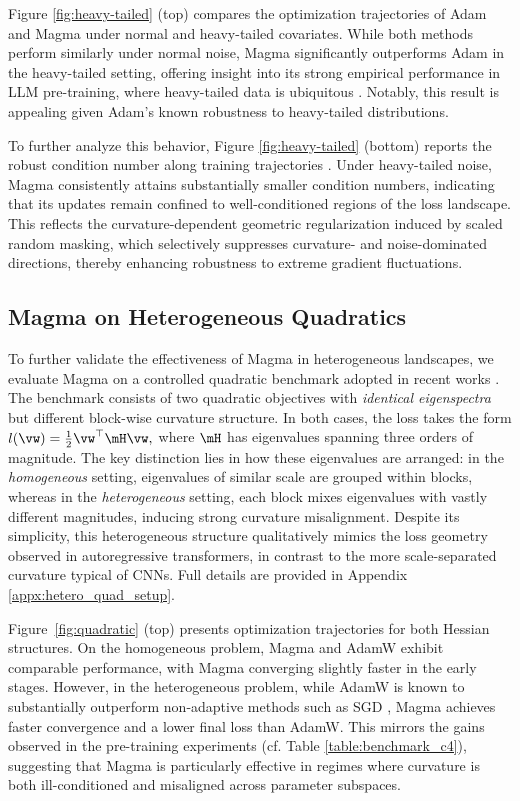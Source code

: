 \documentclass[11pt, a4paper, twocolumn, copyright, goog]{google}
\theoremstyle{plain}
\theoremstyle{definition}
\theoremstyle{remark}
\begin{document}
Figure \ref{fig:heavy-tailed} (top) compares the optimization trajectories of Adam and Magma under normal and heavy-tailed covariates. 
While both methods perform similarly under normal noise, Magma significantly outperforms Adam in the heavy-tailed setting, offering insight into its strong empirical performance in LLM pre-training, where heavy-tailed data is ubiquitous \citep{kunstner2024heavy,ahn2023linear}. 
Notably, this result is appealing given Adam’s known robustness to heavy-tailed distributions.


To further analyze this behavior, Figure \ref{fig:heavy-tailed} (bottom) reports the robust condition number along training trajectories \citep{jiang2023does}. Under heavy-tailed noise, Magma consistently attains substantially smaller condition numbers, indicating that its updates remain confined to well-conditioned regions of the loss landscape. This reflects the curvature-dependent geometric regularization induced by scaled random masking, which selectively suppresses curvature- and noise-dominated directions, thereby enhancing robustness to extreme gradient fluctuations.



\subsection{Magma on Heterogeneous Quadratics}
To further validate the effectiveness of Magma in heterogeneous landscapes, we evaluate Magma on a controlled quadratic benchmark adopted in recent works \citep{zhang2024transformers, orvieto2025search}.
The benchmark consists of two quadratic objectives with \emph{identical eigenspectra} but different block-wise curvature structure. In both cases, the loss takes the form $l(\vw) = \tfrac{1}{2} \vw^\top \mH \vw,$ where $\mH$ has eigenvalues spanning three orders of magnitude. The key distinction lies in how these eigenvalues are arranged: in the \emph{homogeneous} setting, eigenvalues of similar scale are grouped within blocks, whereas in the \emph{heterogeneous} setting, each block mixes eigenvalues with vastly different magnitudes, inducing strong curvature misalignment. 
Despite its simplicity, this heterogeneous structure qualitatively mimics the loss geometry observed in autoregressive transformers, in contrast to the more scale-separated curvature typical of CNNs. Full details are provided in Appendix \ref{appx:hetero_quad_setup}.



Figure~\ref{fig:quadratic} (top) presents optimization trajectories for both Hessian structures.
On the homogeneous problem, Magma and AdamW exhibit comparable performance, with Magma converging slightly faster in the early stages.  
However, in the heterogeneous problem, while AdamW is known to substantially outperform non-adaptive methods such as SGD \citep{zhang2024transformers,orvieto2025search}, Magma achieves faster convergence and a lower final loss than AdamW.  
This mirrors the gains observed in the pre-training experiments (cf. Table \ref{table:benchmark_c4}), suggesting that Magma is particularly effective in regimes where curvature is both ill-conditioned and misaligned across parameter subspaces.
\end{document}
